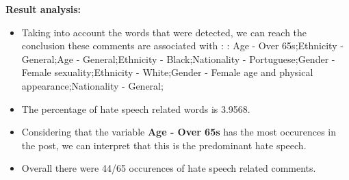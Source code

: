 \documentclass[11pt]{article}
\begin{document}
\textbf{\Large Result analysis:}

\begin{itemize}\item Taking into account the words that were detected, we can reach the conclusion these comments are associated with : : Age - Over 65s;Ethnicity - General;Age - General;Ethnicity - Black;Nationality - Portuguese;Gender - Female sexuality;Ethnicity - White;Gender - Female age and physical appearance;Nationality - General;%

\item The percentage of hate speech related words is 3.9568.

\item Considering that the variable \textbf{Age - Over 65s} has the most occurences in the post, we can interpret that this is the predominant hate speech.

\item Overall there were 44/65 occurences of hate speech related comments.\end{itemize}
\end{document}
